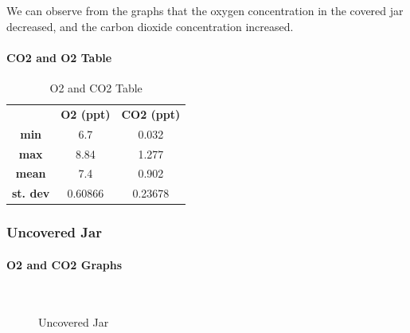 \documentclass[a4paper, 12pt, english]{article}
\begin{document}
We can observe from the graphs that the oxygen concentration in the covered jar
decreased, and the carbon dioxide concentration increased.

\paragraph{CO2 and O2 Table}
\begin{table}[H]
	\caption{\label{tab:Table 2} O2 and CO2 Table}
	\centering
	\begin{tabular}{c c c}
		\toprule
		                 & \textbf{O2 (ppt)}
		                 & \textbf{CO2 (ppt)}           \\
		\cmidrule[0.4pt](r{0.125em}){1-1}%
		\cmidrule[0.4pt](lr{0.125em}){2-2}%
		\cmidrule[0.4pt](lr{0.125em}){3-3}%
		\textbf{min}     & 6.7                & 0.032   \\
		\textbf{max}     & 8.84               & 1.277   \\
		\textbf{mean}    & 7.4                & 0.902   \\
		\textbf{st. dev} & 0.60866            & 0.23678
	\end{tabular}
\end{table}

\subsubsection{Uncovered Jar}
\paragraph{O2 and CO2 Graphs}
\begin{figure}[H]
	\centering
	\\
	\qquad
	\qquad
	\caption{Uncovered Jar}
	\label{fig:UncoveredJar}
\end{figure}
\end{document}
